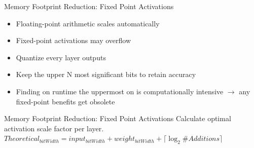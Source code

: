 \begin{frame}{Memory Footprint Reduction: Fixed Point Activations}
	\begin{itemize}
		\item Floating-point arithmetic scales automatically
		\item Fixed-point activations may overflow
		\item Quantize every layer outputs
		\item Keep the upper N most significant bits to retain accuracy
		\item Finding on runtime the uppermost on is computationally intensive $\rightarrow$ any fixed-point benefits get obsolete
	\end{itemize}
\end{frame}

\begin{frame}{Memory Footprint Reduction: Fixed Point Activations}
	\centering
	\large{Calculate optimal activation scale factor per layer.}
	\newline
	\newline
	$Theoretical_{bitWidth} = input_{bitWidth} + weight_{bitWidth} + \lceil \log_2 \#Additions \rceil$
\end{frame}

